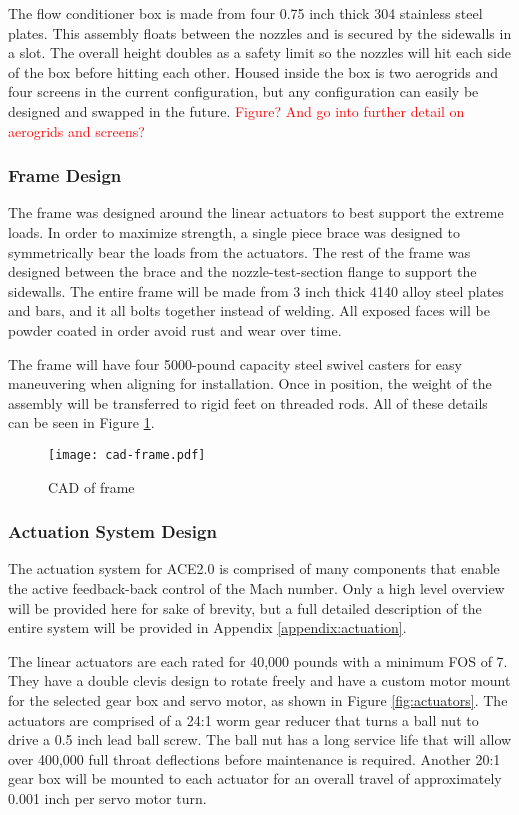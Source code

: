 The flow conditioner box is made from four 0.75 inch thick 304 stainless steel plates. This assembly floats between the nozzles and is secured by the sidewalls in a slot. The overall height doubles as a safety limit so the nozzles will hit each side of the box before hitting each other. Housed inside the box is two aerogrids and four screens in the current configuration, but any configuration can easily be designed and swapped in the future. \textcolor{red}{Figure? And go into further detail on aerogrids and screens?}

\subsubsection{Frame Design}

The frame was designed around the linear actuators to best support the extreme loads. In order to maximize strength, a single piece brace was designed to symmetrically bear the loads from the actuators. The rest of the frame was designed between the brace and the nozzle-test-section flange to support the sidewalls. The entire frame will be made from 3 inch thick 4140 alloy steel plates and bars, and it all bolts together instead of welding. All exposed faces will be powder coated in order avoid rust and wear over time. 

The frame will have four 5000-pound capacity steel swivel casters for easy maneuvering when aligning for installation. Once in position, the weight of the assembly will be transferred to rigid feet on threaded rods. All of these details can be seen in Figure \ref{fig:cad-frame}.

\begin{figure}[ht!]
    \centering
    \texttt{[image: cad-frame.pdf]}
    \caption{CAD of frame}
    \label{fig:cad-frame}
\end{figure}

\subsubsection{Actuation System Design}

The actuation system for ACE2.0 is comprised of many components that enable the active  feedback-back control of the Mach number. Only a high level overview will be provided here for sake of brevity, but a full detailed description of the entire system will be provided in Appendix \ref{appendix:actuation}. 

The linear actuators are each rated for 40,000 pounds with a minimum FOS of 7. They have a double clevis design to rotate freely and have a custom motor mount for the selected gear box and servo motor, as shown in Figure \ref{fig:actuators}. The actuators are comprised of a 24:1 worm gear reducer that turns a ball nut to drive a 0.5 inch lead ball screw. The ball nut has a long service life that will allow over 400,000 full throat deflections before maintenance is required. Another 20:1 gear box will be mounted to each actuator for an overall travel of approximately 0.001 inch per servo motor turn.

